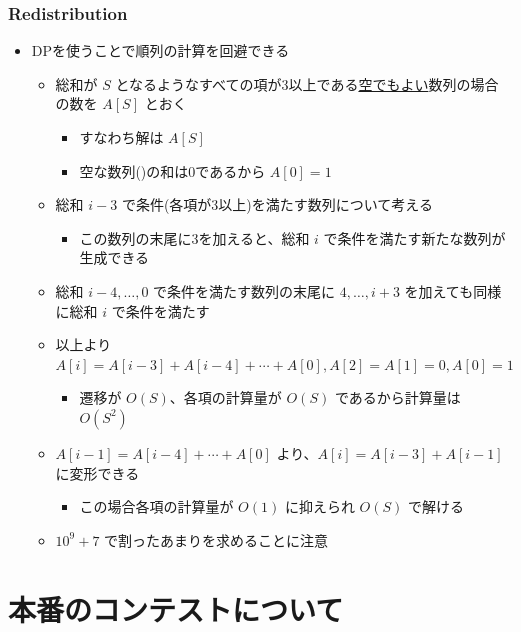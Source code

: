\documentclass[t, aspectratio=169, dvipdfmx]{beamer}
\begin{document}
\begin{frame}
  \frametitle{Redistribution}
  \begin{itemize}
    \item DPを使うことで順列の計算を回避できる
    \begin{itemize}
      \item 総和が $S$ となるようなすべての項が3以上である\underline{空でもよい}数列の場合の数を $A[S]$ とおく
      \begin{itemize}
        \item すなわち解は $A[S]$
        \item 空な数列()の和は0であるから $A[0]=1$
      \end{itemize}
      \item 総和 $i-3$ で条件(各項が3以上)を満たす数列について考える
      \begin{itemize}
        \item この数列の末尾に3を加えると、総和 $i$ で条件を満たす新たな数列が生成できる
      \end{itemize}
      \item 総和 $i-4,\ldots,0$ で条件を満たす数列の末尾に $4,\ldots,i+3$ を加えても同様に総和 $i$ で条件を満たす
      \item 以上より $A[i]=A[i-3]+A[i-4]+\cdots+A[0],A[2]=A[1]=0,A[0]=1$
      \begin{itemize}
        \item 遷移が $O(S)$、各項の計算量が $O(S)$ であるから計算量は $O(S^2)$
      \end{itemize}
      \item $A[i-1]=A[i-4]+\cdots+A[0]$ より、$A[i]=A[i-3]+A[i-1]$ に変形できる
      \begin{itemize}
        \item この場合各項の計算量が $O(1)$ に抑えられ $O(S)$ で解ける
      \end{itemize}
      \item $10^9+7$ で割ったあまりを求めることに注意
    \end{itemize}
  \end{itemize}
\end{frame}

\section{本番のコンテストについて}
\frame{\sectionpage}
\end{document}
